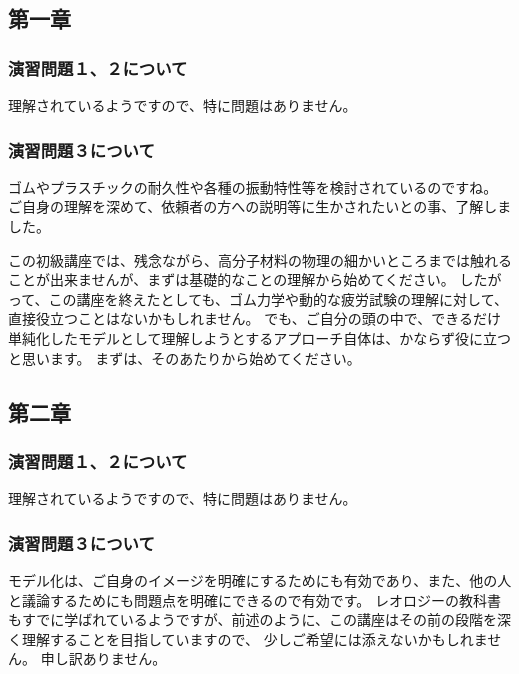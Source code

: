 \documentclass[uplatex,dvipdfmx,a4paper,11pt]{jsreport}
\begin{document}
\subsection*{第一章}
\subsubsection*{演習問題１、２について}
理解されているようですので、特に問題はありません。

\subsubsection*{演習問題３について}
ゴムやプラスチックの耐久性や各種の振動特性等を検討されているのですね。
ご自身の理解を深めて、依頼者の方への説明等に生かされたいとの事、了解しました。

この初級講座では、残念ながら、高分子材料の物理の細かいところまでは触れることが出来ませんが、まずは基礎的なことの理解から始めてください。
したがって、この講座を終えたとしても、ゴム力学や動的な疲労試験の理解に対して、直接役立つことはないかもしれません。
でも、ご自分の頭の中で、できるだけ単純化したモデルとして理解しようとするアプローチ自体は、かならず役に立つと思います。
まずは、そのあたりから始めてください。


\subsection*{第二章}
\subsubsection*{演習問題１、２について}
理解されているようですので、特に問題はありません。

\subsubsection*{演習問題３について}

モデル化は、ご自身のイメージを明確にするためにも有効であり、また、他の人と議論するためにも問題点を明確にできるので有効です。
レオロジーの教科書もすでに学ばれているようですが、前述のように、この講座はその前の段階を深く理解することを目指していますので、
少しご希望には添えないかもしれません。
申し訳ありません。
\end{document}
